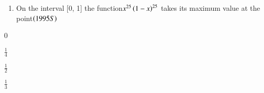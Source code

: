 \documentclass[journal,12pt,twocolumn]{IEEEtran}
\theoremstyle{remark}
\begin{document}
\begin{enumerate}
        \item On the interval [0, 1] the function$x^{25}\left(1-x\right)^{25}$ takes 
its maximum value at the point\hfill$\left(1995S\right)$
\end{enumerate}

\begin{enumerate}[label=\alph*.]
\begin{multicols}{4}
	\item 0 
	\item $\displaystyle\frac{1}{4}$ 
	\item $\displaystyle\frac{1}{2}$ 
        \item $\displaystyle\frac{1}{3}$
\end{multicols}
\end{enumerate}

\newpage
\bigskip
\renewcommand{\thefigure}
{\theenumi}
\renewcommand{\thetable}
{\theenumi}
\end{document}
